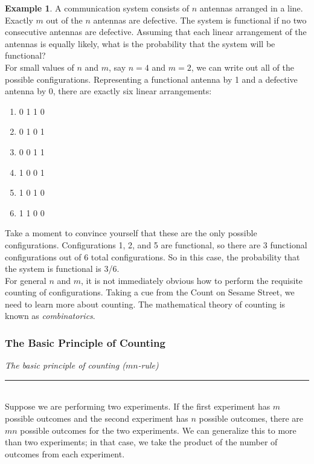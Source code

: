 \documentclass[12pt]{article}
\theoremstyle{definition}
\newtheorem*{example}{Example}
\theoremstyle{remark}
\begin{document}
\begin{example}A communication system consists of $n$ antennas arranged in a line. Exactly $m$ out of the $n$ antennas are defective. The system is functional if no two consecutive antennas are defective. Assuming that each linear arrangement of the antennas is equally likely, what is the probability that the system will be functional?\\

For small values of $n$ and $m$, say $n = 4$ and $m = 2$, we can write out all of the possible configurations. Representing a functional antenna by 1 and a defective antenna by 0, there are exactly six linear arrangements:
\begin{enumerate}[noitemsep]
\item 0 1 1 0
\item 0 1 0 1
\item 0 0 1 1
\item 1 0 0 1
\item 1 0 1 0
\item 1 1 0 0
\end{enumerate}
Take a moment to convince yourself that these are the only possible configurations. Configurations 1, 2, and 5 are functional, so there are 3 functional configurations out of 6 total configurations. So in this case, the probability that the system is functional is 3/6. \\

For general $n$ and $m$, it is not immediately obvious how to perform the requisite counting of configurations. Taking a cue from the Count on Sesame Street, we need to learn more about counting. The mathematical theory of counting is known as \emph{combinatorics}.
\end{example}

\subsubsection{The Basic Principle of Counting}

\begin{framed}
  \emph{The basic principle of counting ($mn$-rule) }\\
  \rule{\dimexpr{}\fboxrule}{.1pt} \\
  Suppose we are performing two experiments. If the first experiment has $m$ possible outcomes and the second experiment has $n$ possible outcomes, there are $mn$ possible outcomes for the two experiments. We can generalize this to more than two experiments; in that case, we take the product of the number of outcomes from each experiment.
\end{framed}
\end{document}

